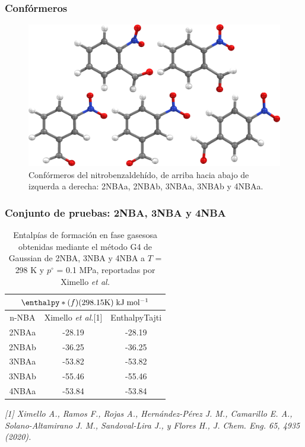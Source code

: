 \documentclass{beamer}
\begin{document}
\begin{frame}
\frametitle{Confórmeros}


\begin{figure}[hbtp]
\begin{center}
\includegraphics[scale=.4]{images/conformeros}
\caption{Confórmeros del nitrobenzaldehído, de arriba hacia abajo de izquerda a derecha: 2NBAa, 2NBAb, 3NBAa, 3NBAb y 4NBAa.}
\label{n-NBA}
\end{center}
\end{figure}

\end{frame}


\begin{frame}
\frametitle{Conjunto de pruebas: 2NBA, 3NBA y 4NBA}

\begin{table}[H]
\centering
\begin{tabular}{|c|c|c|}
\hline
	\multicolumn{3}{||c||}{$\enthalpy*(f){}(298.15 \mathrm{K})\; \mathrm{kJ\;mol^{-1}}$}\\
\hline
\hline
	n-NBA & Ximello \textit{et al.}[1] & EnthalpyTajti\\ 
\hline 
2NBAa & -28.19 & -28.19\\
\hline
2NBAb & -36.25 & -36.25\\ 
\hline 
3NBAa & -53.82 & -53.82\\
\hline
3NBAb & -55.46 & -55.46\\ 
\hline 
4NBAa & -53.84 & -53.84\\ 
\hline  
\end{tabular} 
	\caption{Entalpías de formación en fase gasesosa obtenidas mediante el método G4 de Gaussian de 2NBA, 3NBA y 4NBA a $T$ = 298 K y $p^{\circ}$ = 0.1 MPa, reportadas por Ximello \textit{et al.}}
\label{Ximello-table-1}
\end{table}
\textit{\tiny{[1] Ximello A., Ramos F., Rojas A., Hernández-Pérez J. M., Camarillo E. A., Solano-Altamirano J. M., Sandoval-Lira J., y Flores H., J. Chem. Eng. 65, 4935 (2020).}}
\end{frame}
\end{document}
